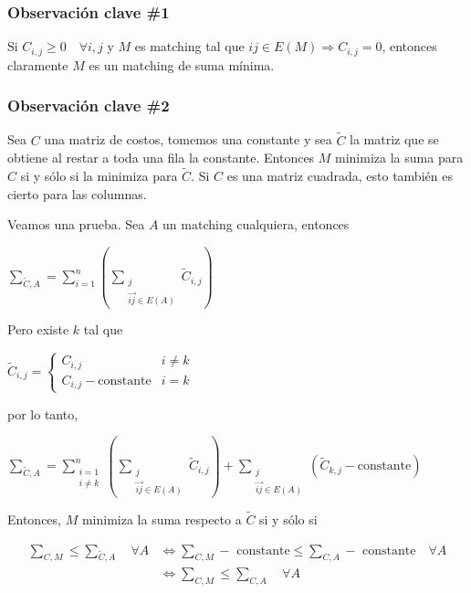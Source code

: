 \documentclass[10pt,a4paper]{article}
\begin{document}
\subsubsection*{Observación clave \#1}

Si $C_{i,j} \geq 0 \quad \forall i, j$ y $M$ es matching tal que $ij \in E(M) \Rightarrow C_{i,j} = 0$, entonces claramente $M$ es un matching de suma mínima.

\subsubsection*{Observación clave \#2}

Sea $C$ una matriz de costos, tomemos una constante y sea $\tilde C$ la matriz que se obtiene al restar a toda una fila la constante. Entonces $M$ minimiza la suma para $C$ si y sólo si la minimiza para $\tilde C$. Si $C$ es una matriz cuadrada, esto también es cierto para las columnas.

Veamos una prueba. Sea $A$ un matching cualquiera, entonces

\begin{center}
$\sum\limits_{\tilde C, A} = \sum\limits_{i = 1}^n \left( \sum\limits_{\substack{j\\ \overrightarrow{ij} \in E(A)}} \tilde C_{i,j}\right)$
\end{center}

Pero existe $k$ tal que

\begin{center}
$\tilde C_{i, j} = \begin{cases} C_{i,j} & i \neq k\\ C_{i,j} - \text{constante} & i = k \end{cases}$
\end{center}

por lo tanto,

\begin{center}
$\sum\limits_{\tilde C, A} = \sum\limits_{\substack{i=1\\i \neq k}}^n \left( \sum\limits_{\substack{j\\ \overrightarrow{ij} \in E(A)}} \tilde C_{i,j}\right) + \sum\limits_{\substack{j\\ \overrightarrow{ij} \in E(A)}} \left(\tilde C_{k,j} - \text{constante}\right)$
\end{center}

Entonces, $M$ minimiza la suma respecto a $\tilde C$ si y sólo si

\begin{center}
\begin{align*} \sum\limits_{C, M} \leq \sum\limits_{\tilde C, A}\quad \forall A &\Leftrightarrow \sum\limits_{C, M}- \text{ constante} \leq \sum\limits_{C, A} - \text{ constante} \quad \forall A\\ &\Leftrightarrow \sum\limits_{C, M} \leq \sum\limits_{C, A} \quad \forall A\\ \end{align*}
\end{center}
\end{document}
